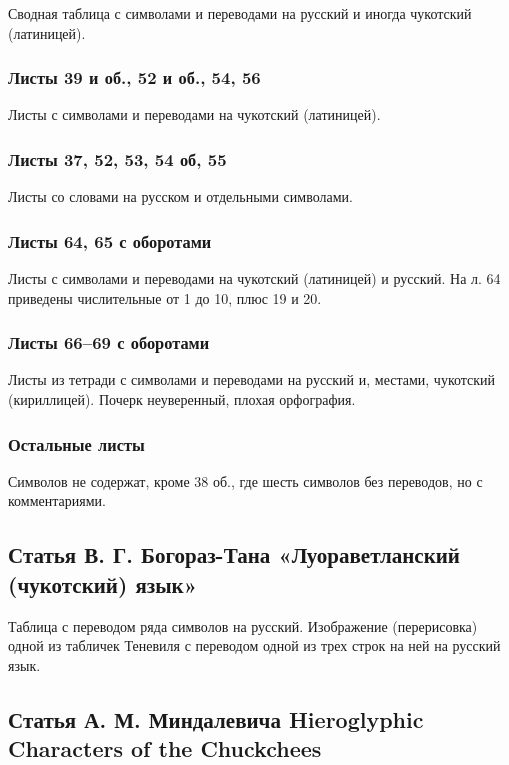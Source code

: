 \documentclass{article}
\newcounter{glyph}
\begin{document}
Сводная таблица с символами и переводами на русский и иногда чукотский (латиницей).

\subsubsection{Листы 39 и об., 52 и об., 54, 56}

Листы с символами и переводами на чукотский (латиницей).

\subsubsection{Листы 37, 52, 53, 54 об, 55}

Листы со словами на русском и отдельными символами.

\subsubsection{Листы 64, 65 с оборотами}

Листы с символами и переводами на чукотский (латиницей) и русский. На л. 64 приведены числительные от 1 до 10, плюс 19 и 20.

\subsubsection{Листы 66–69 с оборотами}

Листы из тетради с символами и переводами на русский и, местами, чукотский (кириллицей). Почерк неуверенный, плохая орфография.

\subsubsection{Остальные листы}

Символов не содержат, кроме 38 об., где шесть символов без переводов, но с комментариями.

\subsection{Статья В. Г. Богораз-Тана «Луораветланский (чукотский) язык»}

Таблица с переводом ряда символов на русский. Изображение (перерисовка) одной из табличек Теневиля с переводом одной из трех строк на ней на русский язык.

\subsection{Статья А. М. Миндалевича Hieroglyphic Characters of the Chuckchees}
\end{document}
